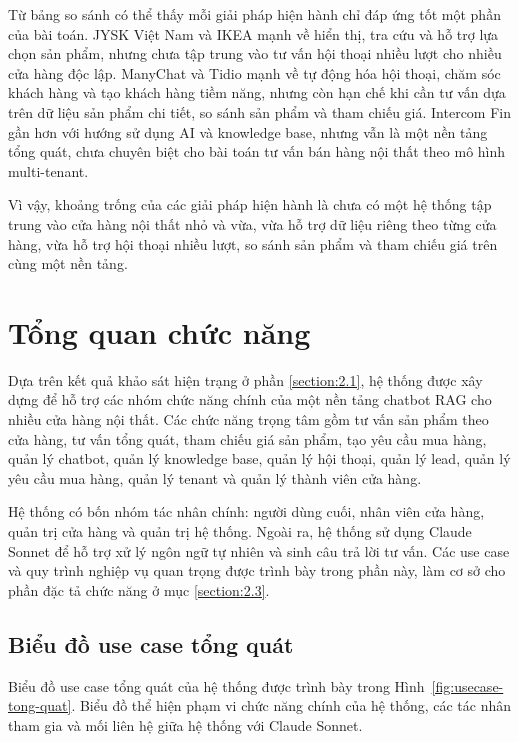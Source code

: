 \documentclass[../DoAn.tex]{subfiles}
\begin{document}
Từ bảng so sánh có thể thấy mỗi giải pháp hiện hành chỉ đáp ứng tốt một phần của bài toán. JYSK Việt Nam và IKEA mạnh về hiển thị, tra cứu và hỗ trợ lựa chọn sản phẩm, nhưng chưa tập trung vào tư vấn hội thoại nhiều lượt cho nhiều cửa hàng độc lập. ManyChat và Tidio mạnh về tự động hóa hội thoại, chăm sóc khách hàng và tạo khách hàng tiềm năng, nhưng còn hạn chế khi cần tư vấn dựa trên dữ liệu sản phẩm chi tiết, so sánh sản phẩm và tham chiếu giá. Intercom Fin gần hơn với hướng sử dụng AI và knowledge base, nhưng vẫn là một nền tảng tổng quát, chưa chuyên biệt cho bài toán tư vấn bán hàng nội thất theo mô hình multi-tenant.

Vì vậy, khoảng trống của các giải pháp hiện hành là chưa có một hệ thống tập trung vào cửa hàng nội thất nhỏ và vừa, vừa hỗ trợ dữ liệu riêng theo từng cửa hàng, vừa hỗ trợ hội thoại nhiều lượt, so sánh sản phẩm và tham chiếu giá trên cùng một nền tảng.

\section{Tổng quan chức năng}
\label{section:2.2}

Dựa trên kết quả khảo sát hiện trạng ở phần \ref{section:2.1}, hệ thống được xây dựng để hỗ trợ các nhóm chức năng chính của một nền tảng chatbot RAG cho nhiều cửa hàng nội thất. Các chức năng trọng tâm gồm tư vấn sản phẩm theo cửa hàng, tư vấn tổng quát, tham chiếu giá sản phẩm, tạo yêu cầu mua hàng, quản lý chatbot, quản lý knowledge base, quản lý hội thoại, quản lý lead, quản lý yêu cầu mua hàng, quản lý tenant và quản lý thành viên cửa hàng.

Hệ thống có bốn nhóm tác nhân chính: người dùng cuối, nhân viên cửa hàng, quản trị cửa hàng và quản trị hệ thống. Ngoài ra, hệ thống sử dụng Claude Sonnet để hỗ trợ xử lý ngôn ngữ tự nhiên và sinh câu trả lời tư vấn. Các use case và quy trình nghiệp vụ quan trọng được trình bày trong phần này, làm cơ sở cho phần đặc tả chức năng ở mục \ref{section:2.3}.

\subsection{Biểu đồ use case tổng quát}
\label{subsection:2.2.1}

Biểu đồ use case tổng quát của hệ thống được trình bày trong Hình~\ref{fig:usecase-tong-quat}. Biểu đồ thể hiện phạm vi chức năng chính của hệ thống, các tác nhân tham gia và mối liên hệ giữa hệ thống với Claude Sonnet.
\end{document}
